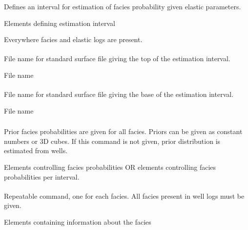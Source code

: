 \subsubsection{}
 \slist
   \item \Description Defines an interval for estimation of facies probability given elastic parameters.
   \item \Argument Elements defining estimation interval
   \item \Default Everywhere facies and elastic logs are present.
 \elist

\paragraph{}{
 \slist
   \item \Description File name for standard surface file giving the top of the estimation interval.
   \item \Argument File name
   \item \Default
 \elist

\paragraph{}
 \slist
   \item \Description File name for standard surface file giving the base of the estimation interval.
   \item \Argument File name
   \item \Default
 \elist

\subsubsection{}
 \slist
   \item \Description Prior facies probabilities are given for all
     facies. Priors can be given as constant numbers or 3D
     cubes. If this command is not given, prior distribution is
     estimated from wells.
   \item \Argument Elements controlling facies probabilities OR elements controlling facies probabilities per interval.
   \item \Default
 \elist

\paragraph{}
 \slist
   \item \Description Repeatable command, one for each facies. All facies present in well logs must be given.
   \item \Argument Elements containing information about the facies
   \item \Default
 \elist

}
